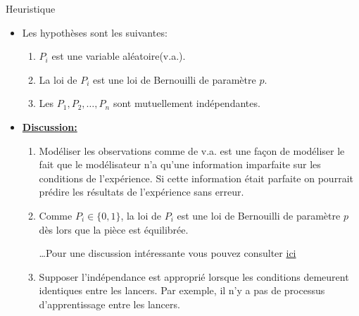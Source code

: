 \begin{frame}[allowframebreaks]{Heuristique}
\begin{itemize}
    \item Les hypothèses sont les suivantes:

\begin{enumerate}
    \item $P_i$ est une variable aléatoire(v.a.).
    \item La loi de $P_i$ est une loi de Bernouilli de paramètre $p$.
    \item Les $P_1, P_2, \ldots, P_n$ sont mutuellement indépendantes.
\end{enumerate}

\framebreak

     \item \textbf{\underline{Discussion:}}
    \begin{enumerate}
    \item Modéliser les observations comme de v.a. est une façon de modéliser 
    le fait que le modélisateur n'a qu'une information imparfaite sur 
    les conditions de l'expérience. Si cette information était parfaite on pourrait 
    prédire les résultats de l'expérience sans erreur.
    \item Comme $P_i\in\{0, 1\}$, la loi de $P_i$ est une loi de Bernouilli de paramètre $p$ 
    dès lors que la pièce est équilibrée.
    \medskip

    \ldots Pour une discussion intéressante vous pouvez consulter 
    \href{https://softmath.seas.harvard.edu/publication/probability-geometry-and-dynamics-in-the-toss-of-a-thick-coin/}
    {ici}
    \item Supposer l'indépendance est approprié lorsque 
    les conditions demeurent identiques entre les lancers. Par exemple, 
     il n'y a pas de processus d'apprentissage entre les lancers.
    \end{enumerate}
\end{itemize}
\end{frame}

